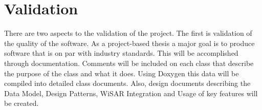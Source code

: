 \documentclass[12pt]{IEEEtran}
\begin{document}
% 
% 
% 

\section{Validation}
There are two aspects to the validation of the project.  The first is validation
of the quality of the software.  As a project-based thesis a major goal is to
produce software that is on par with industry standards.  This will be
accomplished through documentation.  Comments will be included on each class
that describe the purpose of the class and what it does.  Using Doxygen this
data will be compiled into detailed class documents.  Also, design documents
describing the Data Model, Design Patterns, WiSAR Integration and Usage of key
features will be created.
\end{document}
